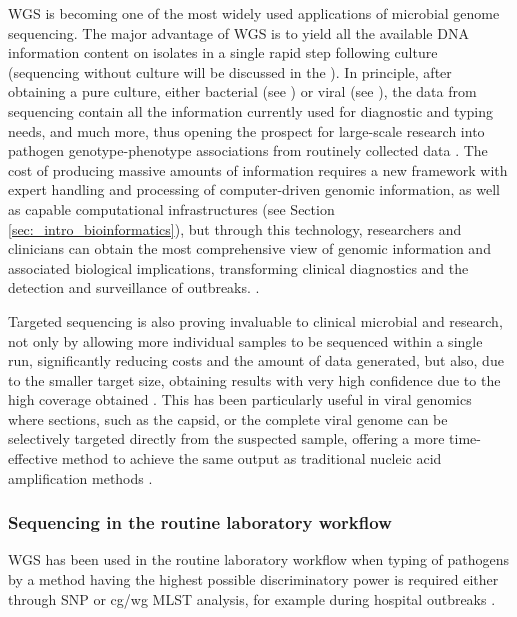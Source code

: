 \ac{WGS} is becoming one of the most widely used applications of microbial genome sequencing. 
The major advantage of \ac{WGS} is to yield all the available \ac{DNA} information content on isolates in a single rapid step following culture (sequencing without culture will be discussed in the ). 
In principle, after obtaining a pure culture, either bacterial (see ) or viral (see ), the data from sequencing contain all the information currently used for diagnostic and typing needs, and much more, thus opening the prospect for large-scale research into pathogen genotype-phenotype associations from routinely collected data \citep{didelot_transforming_2012}.
The cost of producing massive amounts of information requires a new framework with expert handling and processing of computer-driven genomic information, as well as capable computational infrastructures (see Section \ref{sec:_intro_bioinformatics}), but through this technology, researchers and clinicians can obtain the most comprehensive view of genomic information and associated biological implications, transforming clinical diagnostics and the detection and surveillance of outbreaks. \citep{cirulli_uncovering_2010, nature_reviews_genetics_genomic_2019, goodwin_coming_2016}.

Targeted sequencing is also proving invaluable to clinical microbial and research, not only by allowing more individual samples to be sequenced within a single run, significantly reducing costs and the amount of data generated, but also, due to the smaller target size, obtaining results with very high confidence due to the high coverage obtained \citep{goodwin_coming_2016}.
This has been particularly useful in viral genomics where sections, such as the capsid, or the complete viral genome can be selectively targeted directly from the suspected sample, offering a more time-effective method to achieve the same output as traditional nucleic acid amplification methods \citep{cassedy_virus_2021}. 

\subsubsection{Sequencing in the routine laboratory workflow} \label{sssec:_intro_sequencing_routine_lab}

\ac{WGS} has been used in the routine laboratory workflow when typing of pathogens by a method having the highest possible discriminatory power is required either through \ac{SNP} or \ac{cg/wg MLST} analysis, for example during hospital outbreaks \citep{tagini_bacterial_2017}. 

